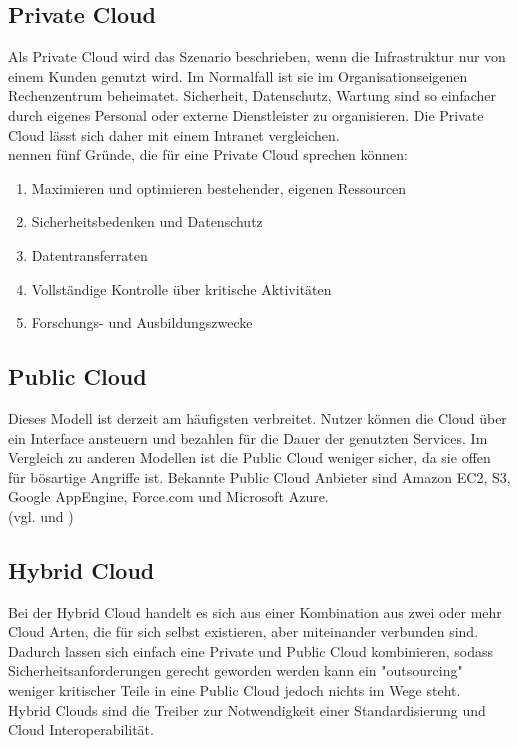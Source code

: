 \subsection{Private Cloud}
Als Private Cloud wird das Szenario beschrieben, wenn die Infrastruktur nur von einem Kunden genutzt wird. Im Normalfall ist sie im Organisationseigenen Rechenzentrum beheimatet. Sicherheit, Datenschutz, Wartung sind so einfacher durch eigenes Personal oder externe Dienstleister zu organisieren. Die Private Cloud lässt sich daher mit einem Intranet vergleichen. \cite[S. 879]{Jadeja.2012} \\
\cite{Tharam.2010} nennen fünf Gründe, die für eine Private Cloud sprechen können:
\begin{enumerate}
\item Maximieren und optimieren bestehender, eigenen Ressourcen
\item Sicherheitsbedenken und Datenschutz
\item Datentransferraten
\item Vollständige Kontrolle über kritische Aktivitäten
\item Forschungs- und Ausbildungszwecke
\end{enumerate}

\subsection{Public Cloud}
Dieses Modell ist derzeit am häufigsten verbreitet. Nutzer können die Cloud über ein Interface ansteuern und bezahlen für die Dauer der genutzten Services. Im Vergleich zu anderen Modellen ist die Public Cloud weniger sicher, da sie offen für bösartige Angriffe ist. Bekannte Public Cloud Anbieter sind Amazon EC2, S3, Google AppEngine, Force.com und Microsoft Azure. \\
(vgl. \cite{Jadeja.2012} und \cite{Tharam.2010})
	
\subsection{Hybrid Cloud}
Bei der Hybrid Cloud handelt es sich aus einer Kombination aus zwei oder mehr Cloud Arten, die für sich selbst existieren, aber miteinander verbunden sind. Dadurch lassen sich einfach eine Private und Public Cloud kombinieren, sodass Sicherheitsanforderungen gerecht geworden werden kann ein "outsourcing" weniger kritischer Teile in eine Public Cloud jedoch nichts im Wege steht.\\
Hybrid Clouds sind die Treiber zur Notwendigkeit einer Standardisierung und Cloud Interoperabilität.


